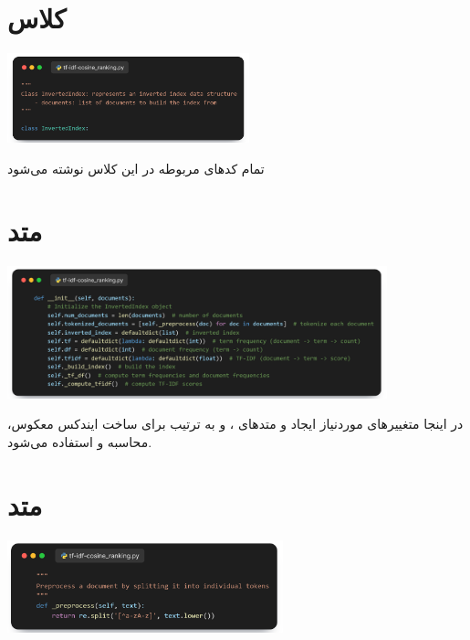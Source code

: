 \documentclass[12pt, dvipsnames, svgnames, x11names,]{article}
\begin{document}
	\section{کلاس }

		\begin{center}
			{\includegraphics[width=7cm]{images/02.png}}
		\end{center}

		{\normalsize تمام کدهای مربوطه در این کلاس نوشته می‌شود}

	\section{متد }
		
		\begin{center}
			{\includegraphics[width=11cm]{images/03.png}}
		\end{center}
		
		{\normalsize
			در اینجا متغییرهای موردنیاز ایجاد و متدهای ،  و  به ترتیب برای ساخت ایندکس معکوس،‌ محاسبه  و  استفاده می‌شود.
		} \par

	\section{متد }
		
		\begin{center}
			{\includegraphics[width=8cm]{images/04.png}}
		\end{center}
		
\end{document}
